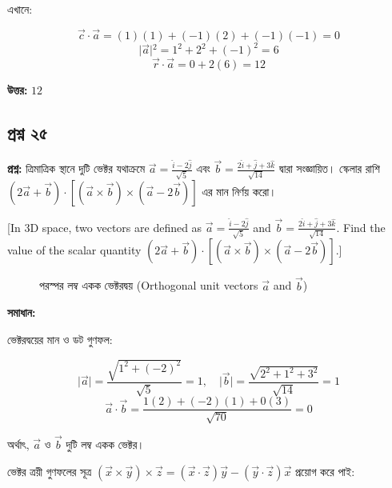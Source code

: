 \documentclass{article}
\begin{document}
এখানে:

$$\vec{c} \cdot \vec{a} = (1)(1) + (-1)(2) + (-1)(-1) = 0$$
$$\vert{}\vec{a}\vert{}^2 = 1^2 + 2^2 + (-1)^2 = 6$$
$$\vec{r} \cdot \vec{a} = 0 + 2(6) = 12$$

\textbf{উত্তর:} $12$

\hrulefill

\subsection*{প্রশ্ন ২৫}
\textbf{প্রশ্ন:} ত্রিমাত্রিক স্থানে দুটি ভেক্টর যথাক্রমে $\vec{a} = \frac{\hat{i} - 2\hat{j}}{\sqrt{5}}$ এবং $\vec{b} = \frac{2\hat{i} + \hat{j} + 3\hat{k}}{\sqrt{14}}$ দ্বারা সংজ্ঞায়িত। স্কেলার রাশি $(2\vec{a} + \vec{b}) \cdot [(\vec{a} \times \vec{b}) \times (\vec{a} - 2\vec{b})]$ এর মান নির্ণয় করো।

[In 3D space, two vectors are defined as $\vec{a} = \frac{\hat{i} - 2\hat{j}}{\sqrt{5}}$ and $\vec{b} = \frac{2\hat{i} + \hat{j} + 3\hat{k}}{\sqrt{14}}$. Find the value of the scalar quantity $(2\vec{a} + \vec{b}) \cdot [(\vec{a} \times \vec{b}) \times (\vec{a} - 2\vec{b})]$.]

\begin{figure}[h!]
\centering
{}
\caption{পরস্পর লম্ব একক ভেক্টরদ্বয় (Orthogonal unit vectors $\vec{a}$ and $\vec{b}$)}
\end{figure}

\textbf{সমাধান:}

ভেক্টরদ্বয়ের মান ও ডট গুণফল:

$$\vert{}\vec{a}\vert{} = \frac{\sqrt{1^2 + (-2)^2}}{\sqrt{5}} = 1, \quad \vert{}\vec{b}\vert{} = \frac{\sqrt{2^2 + 1^2 + 3^2}}{\sqrt{14}} = 1$$
$$\vec{a} \cdot \vec{b} = \frac{1(2) + (-2)(1) + 0(3)}{\sqrt{70}} = 0$$

অর্থাৎ, $\vec{a}$ ও $\vec{b}$ দুটি লম্ব একক ভেক্টর।

ভেক্টর ত্রয়ী গুণফলের সূত্র $(\vec{x} \times \vec{y}) \times \vec{z} = (\vec{x} \cdot \vec{z})\vec{y} - (\vec{y} \cdot \vec{z})\vec{x}$ প্রয়োগ করে পাই:
\end{document}
